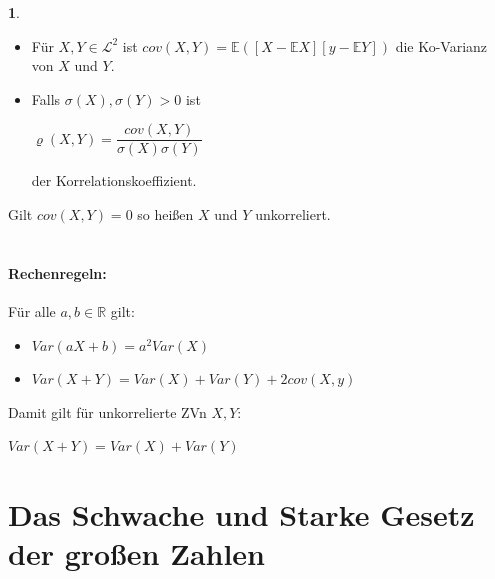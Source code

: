 \documentclass[10pt,a4paper]{report}
\numberwithin{equation}{section}
\numberwithin{figure}{section}
\theoremstyle{plain}
\theoremstyle{definition}
\newtheorem{defn}[thm]{\protect\definitionname}
\theoremstyle{remark}
\theoremstyle{plain}
\providecommand{\definitionname}{Definition}
\newcommand{\1}{ \mathbb{1} } %
\begin{document}
\begin{defn}  
  \begin{itemize}
  \item Für $X,Y \in \mathcal{L}^2$ ist
    $cov(X,Y)=\mathbb{E}([X-\mathbb{E}X][y-\mathbb{E}Y])$ die
    Ko-Varianz von $X$ und $Y$.
  \item Falls $\sigma(X), \sigma(Y)>0$ ist
    \begin{center}
      $\varrho(X,Y)=\dfrac{cov(X,Y)}{\sigma(X)\sigma(Y)}$
    \end{center}
    der Korrelationskoeffizient.
  \end{itemize}
  Gilt $cov(X,Y)=0$ so heißen $X$ und $Y$ unkorreliert.\\\\
\end{defn}
\paragraph{Rechenregeln:}
Für alle $a,b \in \mathbb{R}$ gilt:
\begin{itemize}
\item $Var(aX+b)=a^2Var(X)$
\item $Var(X+Y)=Var(X)+Var(Y)+2cov(X,y)$
\end{itemize}
Damit gilt für unkorrelierte ZVn $X,Y$:
\begin{center}
$Var(X+Y)=Var(X)+Var(Y)$
\end{center} 
\section{Das Schwache und Starke Gesetz der großen Zahlen}
\label{sec:gesetz-grosser-zahlen}
\end{document}
